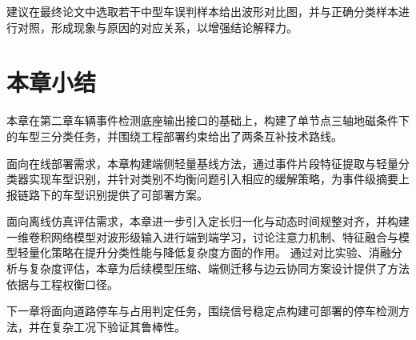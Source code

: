 \documentclass{xdupgthesis}
\begin{document}
建议在最终论文中选取若干中型车误判样本给出波形对比图，并与正确分类样本进行对照，形成现象与原因的对应关系，以增强结论解释力。



\section{本章小结}

本章在第二章车辆事件检测底座输出接口的基础上，构建了单节点三轴地磁条件下的车型三分类任务，并围绕工程部署约束给出了两条互补技术路线。

面向在线部署需求，本章构建端侧轻量基线方法，通过事件片段特征提取与轻量分类器实现车型识别，并针对类别不均衡问题引入相应的缓解策略，为事件级摘要上报链路下的车型识别提供了可部署方案。

面向离线仿真评估需求，本章进一步引入定长归一化与动态时间规整对齐，并构建一维卷积网络模型对波形级输入进行端到端学习，讨论注意力机制、特征融合与模型轻量化策略在提升分类性能与降低复杂度方面的作用。
通过对比实验、消融分析与复杂度评估，本章为后续模型压缩、端侧迁移与边云协同方案设计提供了方法依据与工程权衡口径。

下一章将面向道路停车与占用判定任务，围绕信号稳定点构建可部署的停车检测方法，并在复杂工况下验证其鲁棒性。
\end{document}

